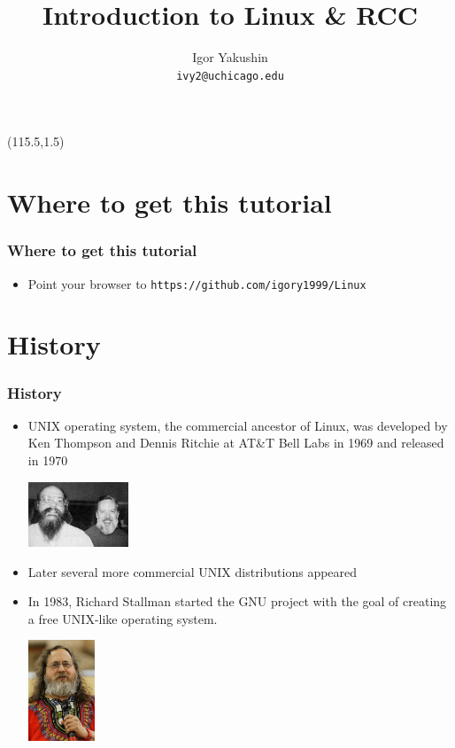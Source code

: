 \documentclass{beamer}
\title{\huge{Introduction to Linux \& RCC}}
\author{Igor Yakushin \\ \texttt{ivy2@uchicago.edu}}
\newcommand{\RCCLogo}{
\begin{textblock}{14}(1.5,1.5)
  \pgfuseimage{logo_rcc}
\end{textblock}
}
\newcommand{\TUX}{
\begin{textblock}{14}(115.5,1.5)
  \pgfuseimage{tux}
\end{textblock}
}
\begin{document}



\begin{frame}
\TUX
\titlepage
\end{frame}

\section{Where to get this tutorial}
\begin{frame}[fragile]
  \frametitle{Where to get this tutorial}
  \begin{itemize}
  \item Point your browser to  {\color{mycolorcli}\verb|https://github.com/igory1999/Linux|}
  \end{itemize}
\end{frame}

\section{History}
\begin{frame}[fragile]
  \frametitle{History}
  \begin{itemize}
  \item UNIX operating system, the commercial ancestor of Linux, was developed by Ken Thompson and Dennis Ritchie at AT\&T Bell Labs in 1969 and released in 1970
\begin{center}
\includegraphics[width=3cm]{graphs/Ken_n_dennis.jpg}
\end{center}
  \item Later several more commercial UNIX distributions appeared
  \item In 1983, Richard Stallman started the GNU project with the goal of creating a free UNIX-like operating system.
\begin{center}
\includegraphics[width=2cm]{graphs/Richard_Stallman.jpg}
\end{center}
\end{itemize}
\end{frame}
\end{document}
